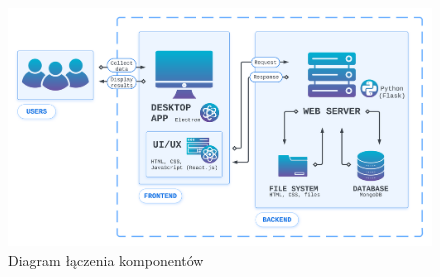 \documentclass[12pt,a4paper,twoside]{article}
\begin{document}
\begin{figure}[h!]
\centering
\includegraphics[width=\textwidth]{img/archi2.png}
\caption{Diagram łączenia komponentów}
\end{figure}\par
\end{document}
